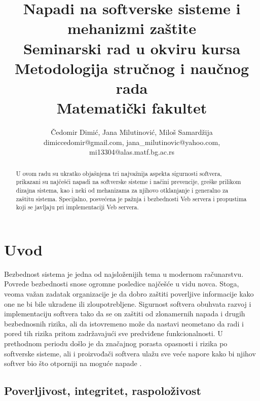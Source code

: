 \documentclass[a4paper]{article}
\begin{document}
\title{Napadi na softverske sisteme i mehanizmi zaštite\\ \small{Seminarski rad u okviru kursa\\Metodologija stručnog i naučnog rada\\ Matematički fakultet}}

\author{Čedomir Dimić, Jana Milutinović, Miloš Samardžija\\ dimiccedomir@gmail.com, jana\_milutinovic@yahoo.com, mi13304@alas.matf.bg.ac.rs}

\maketitle
\begin{abstract}
U ovom radu su ukratko objašnjena tri najvažnija aspekta sigurnosti softvera, prikazani su najčešći napadi na softverske sisteme i načini prevencije, greške prilikom dizajna sistema, kao i neki od mehanizama za njihovo otklanjanje i generalno za zaštitu sistema. Specijalno, posvećena je pažnja i bezbednosti Veb servera i propustima koji se javljaju pri implementaciji Veb servera. 
\end{abstract}

\tableofcontents

\newpage


\section{Uvod}
\label{sec:Uvod}

Bezbednost sistema je jedna od najsloženijih tema u modernom     
računarstvu. Povrede bezbednosti snose ogromne posledice najčešće u vidu novca. Stoga, veoma važan zadatak organizacije je da dobro zaštiti poverljive informacije kako one ne bi bile ukradene ili zloupotrebljene.
Sigurnost softvera obuhvata razvoj i implementaciju softvera tako da se on zaštiti od zlonamernih napada i drugih bezbednosnih rizika, ali da istovremeno može da nastavi neometano da radi i pored tih rizika pritom zadržavajući sve predviđene funkcionalnosti. U prethodnom periodu došlo je da značajnog porasta opasnosti i rizika po softverske sisteme, ali i proizvođači softvera ulažu sve veće napore kako bi njihov softver bio što otporniji na moguće napade \cite{softwaresecurity}.


\subsection{Poverljivost, integritet, raspoloživost}
\label{subsec:CIA model}
\end{document}

